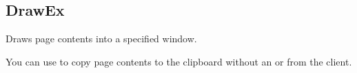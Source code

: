 \documentclass[letterpaper,12pt,english,openany,oneside]{sphinxmanual}
\begin{document}
\subsection{DrawEx}
\label{\detokenize{IAC_API_OLE_Objects:drawex}}
Draws page contents into a specified window.

You can use   to copy page contents to the clipboard without an  or  from the client.


\begin{sphinxVerbatim}[commandchars=\\\{\}]
    

                    

                    
\end{sphinxVerbatim}
\label{\detokenize{IAC_API_OLE_Objects:parameters-74}}
\end{document}

